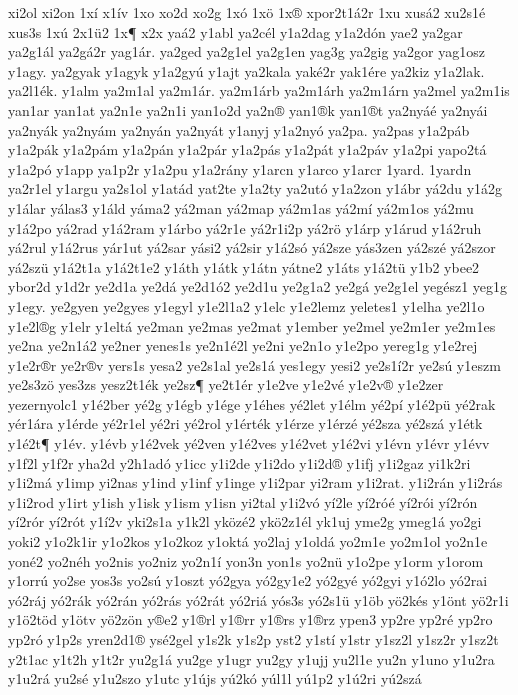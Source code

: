 {xi2ol
xi2on
1xí
x1ív
1xo
xo2d
xo2g
1xó
1xö
1x®
xpor2t1á2r
1xu
xusá2
xu2s1é
xus3s
1xú
2x1ü2
1x¶
x2x
yaá2
y1abl
ya2cél
y1a2dag
y1a2dón
yae2
ya2gar
ya2g1ál
ya2gá2r
yag1ár.
ya2ged
ya2g1el
ya2g1en
yag3g
ya2gig
ya2gor
yag1osz
y1agy.
ya2gyak
y1agyk
y1a2gyú
y1ajt
ya2kala
yaké2r
yak1ére
ya2kiz
y1a2lak.
ya2l1ék.
y1alm
ya2m1al
ya2m1ár.
ya2m1árb
ya2m1árh
ya2m1árn
ya2mel
ya2m1is
yan1ar
yan1at
ya2n1e
ya2n1i
yan1o2d
ya2n®
yan1®k
yan1®t
ya2nyáé
ya2nyái
ya2nyák
ya2nyám
ya2nyán
ya2nyát
y1anyj
y1a2nyó
ya2pa.
ya2pas
y1a2páb
y1a2pák
y1a2pám
y1a2pán
y1a2pár
y1a2pás
y1a2pát
y1a2páv
y1a2pi
yapo2tá
y1a2pó
y1app
ya1p2r
y1a2pu
y1a2rány
y1arcn
y1arco
y1arcr
1yard.
1yardn
ya2r1el
y1argu
ya2s1ol
y1atád
yat2te
y1a2ty
ya2utó
y1a2zon
y1ábr
yá2du
y1á2g
y1álar
yálas3
y1áld
yáma2
yá2man
yá2map
yá2m1as
yá2mí
yá2m1os
yá2mu
y1á2po
yá2rad
y1á2ram
y1árbo
yá2r1e
yá2r1i2p
yá2rö
y1árp
y1árud
y1á2ruh
yá2rul
y1á2rus
yár1ut
yá2sar
yási2
yá2sir
y1á2só
yá2sze
yás3zen
yá2szé
yá2szor
yá2szü
y1á2t1a
y1á2t1e2
y1áth
y1átk
y1átn
yátne2
y1áts
y1á2tü
y1b2
ybee2
ybor2d
y1d2r
ye2d1a
ye2dá
ye2d1ó2
ye2d1u
ye2g1a2
ye2gá
ye2g1el
yegész1
yeg1g
y1egy.
ye2gyen
ye2gyes
y1egyl
y1e2l1a2
y1elc
y1e2lemz
yeletes1
y1elha
ye2l1o
y1e2l®g
y1elr
y1eltá
ye2man
ye2mas
ye2mat
y1ember
ye2mel
ye2m1er
ye2m1es
ye2na
ye2n1á2
ye2ner
yenes1s
ye2n1é2l
ye2ni
ye2n1o
y1e2po
yereg1g
y1e2rej
y1e2r®r
ye2r®v
yers1s
yesa2
ye2s1al
ye2s1á
yes1egy
yesi2
ye2s1í2r
ye2sú
y1eszm
ye2s3zö
yes3zs
yesz2t1ék
ye2sz¶
ye2t1ér
y1e2ve
y1e2vé
y1e2v®
y1e2zer
yezernyolc1
y1é2ber
yé2g
y1égb
y1ége
y1éhes
yé2let
y1élm
yé2pí
y1é2pü
yé2rak
yér1ára
y1érde
yé2r1el
yé2ri
yé2rol
y1érték
y1érze
y1érzé
yé2sza
yé2szá
y1étk
y1é2t¶
y1év.
y1évb
y1é2vek
yé2ven
y1é2ves
y1é2vet
y1é2vi
y1évn
y1évr
y1évv
y1f2l
y1f2r
yha2d
y2h1adó
y1icc
y1i2de
y1i2do
y1i2d®
y1ifj
y1i2gaz
yi1k2ri
y1i2má
y1imp
yi2nas
y1ind
y1inf
y1inge
y1i2par
yi2ram
y1i2rat.
y1i2rán
y1i2rás
y1i2rod
y1irt
y1ish
y1isk
y1ism
y1isn
yi2tal
y1i2vó
yí2le
yí2róé
yí2rói
yí2rón
yí2rór
yí2rót
y1í2v
yki2s1a
y1k2l
yközé2
ykö2z1él
yk1uj
yme2g
ymeg1á
yo2gi
yoki2
y1o2k1ir
y1o2kos
y1o2koz
y1oktá
yo2laj
y1oldá
yo2m1e
yo2m1ol
yo2n1e
yoné2
yo2néh
yo2nis
yo2niz
yo2n1í
yon3n
yon1s
yo2nü
y1o2pe
y1orm
y1orom
y1orrú
yo2se
yos3s
yo2sú
y1oszt
yó2gya
yó2gy1e2
yó2gyé
yó2gyi
y1ó2lo
yó2rai
yó2ráj
yó2rák
yó2rán
yó2rás
yó2rát
yó2riá
yós3s
yó2s1ü
y1öb
yö2kés
y1önt
yö2r1i
y1ö2töd
y1ötv
yö2zön
y®e2
y1®rl
y1®rr
y1®rs
y1®rz
ypen3
yp2re
yp2ré
yp2ro
yp2ró
y1p2s
yren2d1®
ysé2gel
y1s2k
y1s2p
yst2
y1stí
y1str
y1sz2l
y1sz2r
y1sz2t
y2t1ac
y1t2h
y1t2r
yu2g1á
yu2ge
y1ugr
yu2gy
y1ujj
yu2l1e
yu2n
y1uno
y1u2ra
y1u2rá
yu2sé
y1u2szo
y1utc
y1újs
yú2kó
yúl1l
yú1p2
y1ú2ri
yú2szá
}
